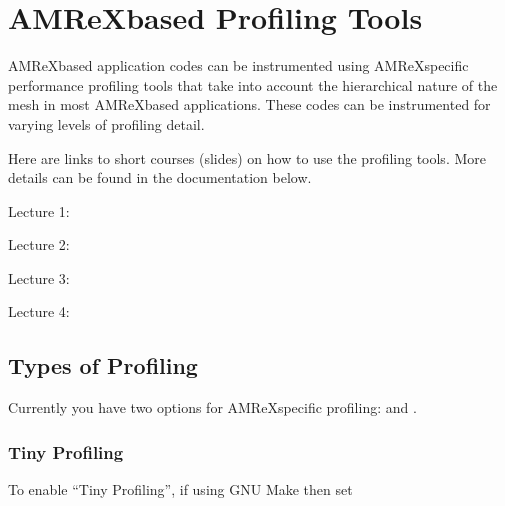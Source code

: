 \documentclass[letterpaper,10pt,english]{sphinxmanual}
\begin{document}
\chapter{AMReX\sphinxhyphen{}based Profiling Tools}
\label{\detokenize{AMReX_Profiling_Tools_Chapter:amrex-based-profiling-tools}}\label{\detokenize{AMReX_Profiling_Tools_Chapter:chap-amrex-based-profiling-tools}}\label{\detokenize{AMReX_Profiling_Tools_Chapter::doc}}
\sphinxAtStartPar
AMReX\sphinxhyphen{}based application codes can be instrumented using AMReX\sphinxhyphen{}specific
performance profiling tools that take into account the hierarchical nature of
the mesh in most AMReX\sphinxhyphen{}based applications. These codes can be instrumented for
varying levels of profiling detail.

\sphinxAtStartPar
Here are links to short courses (slides) on how to use the profiling tools.
More details can be found in the documentation below.

\sphinxAtStartPar
Lecture 1: 

\sphinxAtStartPar
Lecture 2: 

\sphinxAtStartPar
Lecture 3: 

\sphinxAtStartPar
Lecture 4: 


\section{Types of Profiling}
\label{\detokenize{AMReX_Profiling_Tools:types-of-profiling}}\label{\detokenize{AMReX_Profiling_Tools::doc}}
\sphinxAtStartPar
Currently you have two options for AMReX\sphinxhyphen{}specific profiling:
{\hyperref[\detokenize{AMReX_Profiling_Tools:sec-tiny-profiling}]{}} and {\hyperref[\detokenize{AMReX_Profiling_Tools:sec-full-profiling}]{}}.


\subsection{Tiny Profiling}
\label{\detokenize{AMReX_Profiling_Tools:tiny-profiling}}\label{\detokenize{AMReX_Profiling_Tools:sec-tiny-profiling}}
\sphinxAtStartPar
To enable “Tiny Profiling”, if using GNU Make then set
\end{document}
